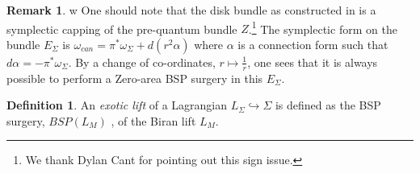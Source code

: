 \documentclass[11pt, oneside,dvipsnames]{amsart}
\renewcommand{\to}{\rightarrow}
\renewcommand{\to}{\rightarrow}
\newcommand{\<}{\langle}
\renewcommand{\>}{\rangle}
\newcommand{\bC}{\mathbb{C}}
\newcommand{\bD}{\mathbb{D}}
\renewcommand{\to}{\rightarrow}
\newtheorem{prop}[Theorem]{Proposition}
\theoremstyle{definition}
\theoremstyle{definition}
\newtheorem{remark}[Theorem]{Remark}
\newtheorem{defn}[Theorem]{Definition}
\numberwithin{equation}{subsection}
\begin{document}
    \begin{remark}
        
w    One should note that the disk bundle as constructed in \cite{bc09,b06} is a symplectic capping of the pre-quantum bundle $Z$.\footnote{We thank Dylan Cant for pointing out this sign issue.} The symplectic form on the bundle $E_\Sigma$ is $\omega_{can} = \pi^* \omega_\Sigma + d(r^2 \alpha)$ where $\alpha$ is a connection form such that $d\alpha= -\pi^* \omega_\Sigma$. By a change of co-ordinates, $r \mapsto \frac{1}{r}$, one sees that it is always possible to perform a Zero-area BSP surgery in this $E_\Sigma$.
    \end{remark}

\begin{defn}
    An \textit{exotic lift} of a Lagrangian $L_\Sigma \hookrightarrow \Sigma$ is defined as the BSP surgery, $BSP(L_M)$ , of the Biran lift $L_M$.
\end{defn}


      
   
   

    
\end{document}
